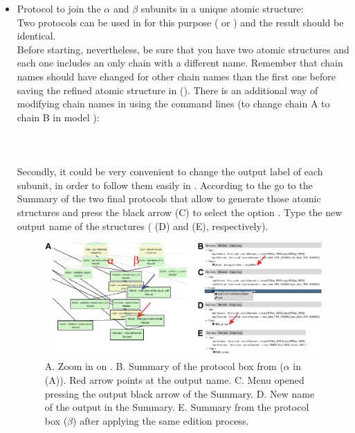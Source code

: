 \begin{itemize}
 \item Protocol to join the  $\alpha$ and $\beta$ subunits in a unique atomic structure:\\ Two protocols can be used in \scipion for this purpose ( or ) and the result should be identical. \\
 Before starting, nevertheless, be sure that you have two atomic structures and each one includes an only chain with a different name. Remember that chain names should have changed for other chain names than the first one before saving the refined atomic structure in \coot (). There is an additional way of modifying chain names in \chimera using the \chimera command lines (to change chain A to chain B in model ):\\ \\ \\ \\Secondly, it could be very convenient to change the \scipion output label of each subunit, in order to follow them easily in \scipion. According to the  go to the Summary of the two final protocols that allow to generate those atomic structures and press the black arrow (C) to select the option . Type the new output name of the structures ( (D) and  (E), respectively).\\
    
  \begin{figure}[H]
  \centering 
  \captionsetup{width=.9\linewidth} 
  \includegraphics[width=1\textwidth]{Images/Fig75}
  \caption{A. Zoom in on . B. Summary of the protocol box from \phenix {} ($\alpha$ in (A)). Red arrow points at the \scipion output name. C. Menu opened pressing the output black arrow of the Summary. D. New name of the \scipion output in the Summary. E. Summary from the protocol box \phenix {} ($\beta$) after applying the same edition process.}
  \label{fig:scipion_workflow_edition}
  \end{figure}
  

\end{itemize}
